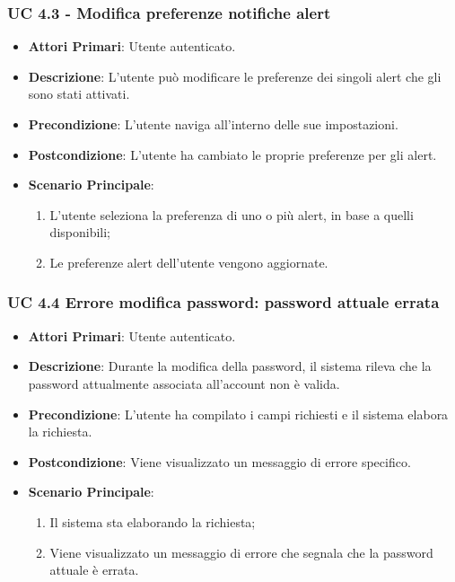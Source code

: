 			\subsubsection{UC 4.3 - Modifica preferenze notifiche alert}
			\begin{itemize}
				\item \textbf{Attori Primari}: Utente autenticato.
				\item \textbf{Descrizione}: L'utente può modificare le preferenze dei singoli alert che gli sono stati attivati.
				\item \textbf{Precondizione}: L'utente naviga all'interno delle sue impostazioni.
				\item \textbf{Postcondizione}: L'utente ha cambiato le proprie preferenze per gli alert.
				\item \textbf{Scenario Principale}:
				\begin{enumerate}
					\item{L'utente seleziona la preferenza di uno o più alert, in base a quelli disponibili;}
					\item{Le preferenze alert dell'utente vengono aggiornate.}
				\end{enumerate}
			\end{itemize}	

			\subsubsection{UC 4.4 Errore modifica password: password attuale errata}
			\begin{itemize}
				\item \textbf{Attori Primari}: Utente autenticato.
				\item \textbf{Descrizione}: Durante la modifica della password, il sistema rileva che la password attualmente associata all'account non è valida.
				\item \textbf{Precondizione}: L'utente ha compilato i campi richiesti e il sistema elabora la richiesta.
				\item \textbf{Postcondizione}: Viene visualizzato un messaggio di errore specifico.
				\item \textbf{Scenario Principale}:
				\begin{enumerate}
					\item Il sistema sta elaborando la richiesta;
					\item Viene visualizzato un messaggio di errore che segnala che la password attuale è errata.
				\end{enumerate}
			\end{itemize}

